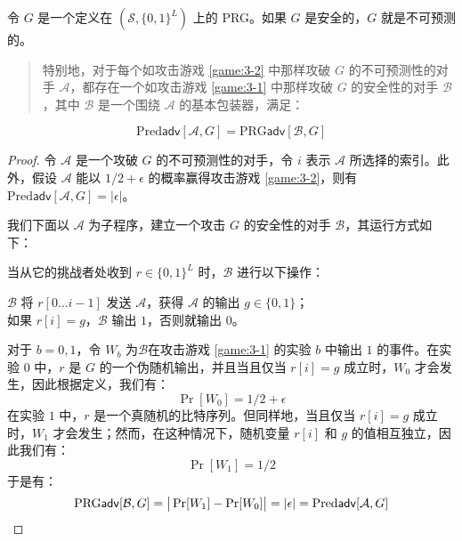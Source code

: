 \begin{theorem}
令 $G$ 是一个定义在 $(\mathcal{S},\{0,1\}^L)$ 上的 PRG。如果 $G$ 是安全的，$G$ 就是不可预测的。
\begin{quote}
特别地，对于每个如攻击游戏 \ref{game:3-2} 中那样攻破 $G$ 的不可预测性的对手 $\mathcal{A}$，都存在一个如攻击游戏 \ref{game:3-1} 中那样攻破 $G$ 的安全性的对手 $\mathcal{B}$，其中 $\mathcal{B}$ 是一个围绕 $\mathcal{A}$ 的基本包装器，满足：
\end{quote}
\[
\mathrm{Pred}\mathsf{adv}[\mathcal{A},G]
=
\mathrm{PRG}\mathsf{adv}[\mathcal{B},G]
\]
\end{theorem}

\begin{proof}
令 $\mathcal{A}$ 是一个攻破 $G$ 的不可预测性的对手，令 $i$ 表示 $\mathcal{A}$ 所选择的索引。此外，假设 $\mathcal{A}$ 能以 $1/2+\epsilon$ 的概率赢得攻击游戏 \ref{game:3-2}，则有 $\mathrm{Pred}\mathsf{adv}[\mathcal{A},G]=|\epsilon|$。

我们下面以 $\mathcal{A}$ 为子程序，建立一个攻击 $G$ 的安全性的对手 $\mathcal{B}$，其运行方式如下：

\vspace*{10pt}

\hspace*{5pt} 当从它的挑战者处收到 $r\in\{0,1\}^L$ 时，$\mathcal B$ 进行以下操作：

\vspace*{5pt}

\hspace*{28.5pt} $\mathcal{B}$ 将 $r[0\dots i-1]$ 发送 $\mathcal{A}$，获得 $\mathcal{A}$ 的输出 $g\in\{0,1\}$；\\
\hspace*{50pt} 如果 $r[i]=g$，$\mathcal{B}$ 输出 $1$，否则就输出 $0$。

\vspace*{10pt}

对于 $b=0,1$，令 $W_b$ 为$\mathcal{B}$在攻击游戏 \ref{game:3-1} 的实验 $b$ 中输出 $1$ 的事件。在实验 $0$ 中，$r$ 是 $G$ 的一个伪随机输出，并且当且仅当 $r[i]=g$ 成立时，$W_0$ 才会发生，因此根据定义，我们有：
\[
\Pr[W_0]=1/2+\epsilon
\]
在实验 $1$ 中，$r$ 是一个真随机的比特序列。但同样地，当且仅当 $r[i]=g$ 成立时，$W_1$ 才会发生；然而，在这种情况下，随机变量 $r[i]$ 和 $g$ 的值相互独立，因此我们有：
\[
\Pr[W_1]=1/2
\]
于是有：
\[
\mathrm{PRG}\mathsf{adv}[\mathcal{B},G]
=\big\lvert\Pr[W_1]-\Pr[W_0]\big\rvert
=|\epsilon|
=\mathrm{Pred}\mathsf{adv}[\mathcal{A},G]
\qedhere
\]
\end{proof}

